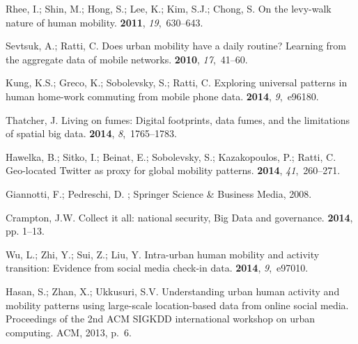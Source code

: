 \documentclass[ijgi,article,accept,moreauthors,pdftex,10pt,a4paper]{mdpi}
\theoremstyle{mdpi}
\newcounter{ex}
\newcounter{re}
\theoremstyle{mdpidefinition}
\begin{document}
\begin{thebibliography}{-------}
Rhee, I.; Shin, M.; Hong, S.; Lee, K.; Kim, S.J.; Chong, S.
\newblock On the levy-walk nature of human mobility.
 {\bf 2011}, {\em
  19},~630--643.

Sevtsuk, A.; Ratti, C.
\newblock Does urban mobility have a daily routine? Learning from the aggregate
  data of mobile networks.
 {\bf 2010}, {\em 17},~41--60.

Kung, K.S.; Greco, K.; Sobolevsky, S.; Ratti, C.
\newblock Exploring universal patterns in human home-work commuting from mobile
  phone data.
 {\bf 2014}, {\em 9},~e96180.

Thatcher, J.
\newblock Living on fumes: Digital footprints, data fumes, and the limitations
  of spatial big data.
 {\bf 2014}, {\em
  8},~1765--1783.

Hawelka, B.; Sitko, I.; Beinat, E.; Sobolevsky, S.; Kazakopoulos, P.; Ratti, C.
\newblock Geo-located Twitter as proxy for global mobility patterns.
 {\bf 2014}, {\em
  41},~260--271.

Giannotti, F.; Pedreschi, D.
; Springer Science \& Business Media,  2008.

Crampton, J.W.
\newblock Collect it all: national security, Big Data and governance.
 {\bf 2014}, pp. 1--13.

Wu, L.; Zhi, Y.; Sui, Z.; Liu, Y.
\newblock Intra-urban human mobility and activity transition: Evidence from
  social media check-in data.
 {\bf 2014}, {\em 9},~e97010.

Hasan, S.; Zhan, X.; Ukkusuri, S.V.
\newblock Understanding urban human activity and mobility patterns using
  large-scale location-based data from online social media.
\newblock  Proceedings of the 2nd ACM SIGKDD international workshop on urban
  computing. ACM,  2013, p.~6.


\end{thebibliography}
\end{document}
